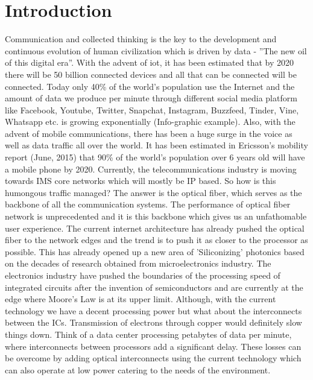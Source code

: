\documentclass[../report.tex]{subfiles}
\begin{document}
	
	
\chapter{Introduction} 
Communication and collected thinking is the key to the development and continuous evolution of human civilization which is driven by data - ”The new oil of this digital era”. With the advent of \gls{iot}, it has been estimated that by 2020 there will be 50 billion connected devices and all that can be connected will be connected. Today only 40\% of the world’s population use the Internet and the amount of data we produce per minute through different social media platform like Facebook, Youtube, Twitter, Snapchat, Instagram, Buzzfeed, Tinder, Vine, Whatsapp etc. is growing exponentially (Info-graphic example). Also, with the advent of mobile communications, there has been a huge surge in the voice as well as data traffic all over the world. It has been estimated in Ericsson’s mobility report (June, 2015) that 90\% of the world’s population over 6 years old will have a mobile phone by 2020. Currently, the telecommunications industry is moving towards IMS core networks which will mostly be IP based. So how is this humongous traffic managed? The answer is the optical fiber, which serves as the backbone of all the communication systems. The performance of optical fiber network is unprecedented and it is this backbone which gives us an unfathomable user experience. The current internet architecture has already pushed the optical fiber to the network edges and the trend is to push it as closer to the processor as possible. This has already opened up a new area of 'Siliconizing' photonics based on the decades of research obtained from microelectronics industry. The electronics industry have pushed the boundaries of the processing speed of integrated circuits after the invention of semiconductors and are currently at the edge where Moore’s Law is at its upper limit. Although, with the current technology we have a decent processing power but what about the interconnects between the ICs. Transmission of electrons through copper would definitely slow things down. Think of a data center processing petabytes of data per minute, where interconnects between processors add a significant delay. These losses can be overcome by adding optical interconnects using the current technology which can also operate at low power catering to the needs of the environment.  
	
\end{document}
